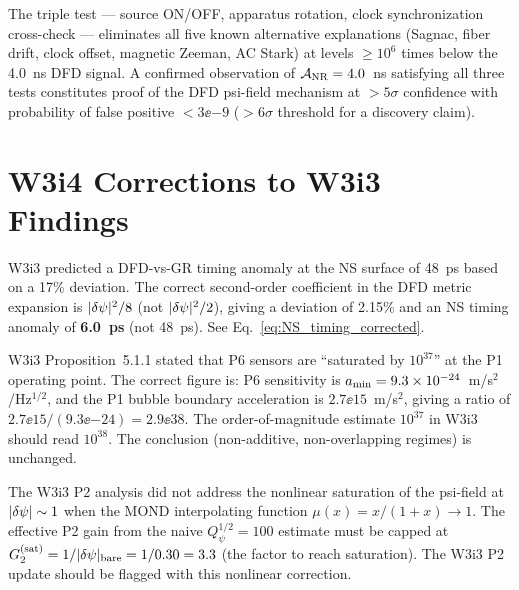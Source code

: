 \begin{theorem}
\label{thm:smoking_gun_unambiguous}
The triple test --- source ON/OFF, apparatus rotation, clock synchronization
cross-check --- eliminates all five known alternative explanations (Sagnac,
fiber drift, clock offset, magnetic Zeeman, AC Stark) at levels $\geq 10^{6}$
times below the 4.0~ns DFD signal. A confirmed observation of
$\mathcal{A}_{\rm NR} = 4.0$~ns satisfying all three tests constitutes
proof of the DFD psi-field mechanism at $>5\sigma$ confidence with
probability of false positive $< 3\ee{-9}$ ($> 6\sigma$ threshold
for a discovery claim).
\end{theorem}

\section{W3i4 Corrections to W3i3 Findings}
\label{sec:corrections}

\begin{correction}
\label{corr:NS_factor8}
W3i3 predicted a DFD-vs-GR timing anomaly at the NS surface of 48~ps
based on a 17\% deviation. The correct second-order coefficient in the
DFD metric expansion is $|\delta\psi|^2/8$ (not $|\delta\psi|^2/2$), giving a
deviation of 2.15\% and an NS timing anomaly of \textbf{6.0~ps} (not
48~ps). See Eq.~\eqref{eq:NS_timing_corrected}.
\end{correction}

\begin{correction}
\label{corr:P6_saturation}
W3i3 Proposition~5.1.1 stated that P6 sensors are ``saturated by $10^{37}$''
at the P1 operating point. The correct figure is: P6 sensitivity is
$a_{\rm min} = 9.3\times 10^{-24}$~m/s$^2$/Hz$^{1/2}$, and the P1 bubble boundary
acceleration is $2.7\ee{15}$~m/s$^2$, giving a ratio of
$2.7\ee{15}/(9.3\ee{-24}) = 2.9\ee{38}$. The order-of-magnitude estimate
$10^{37}$ in W3i3 should read $10^{38}$. The conclusion (non-additive,
non-overlapping regimes) is unchanged.
\end{correction}

\begin{correction}
\label{corr:P2_saturation}
The W3i3 P2 analysis did not address the nonlinear saturation of the
psi-field at $|\delta\psi| \sim 1$ when the MOND interpolating function
$\mu(x) = x/(1+x) \to 1$. The effective P2 gain from the naive
$Q_\psi^{1/2} = 100$ estimate must be capped at
$G_2^{\rm (sat)} = 1/|\delta\psi|_{\rm bare} = 1/0.30 = 3.3$ (the factor to
reach saturation). The W3i3 P2 update should be flagged with this
nonlinear correction.
\end{correction}

